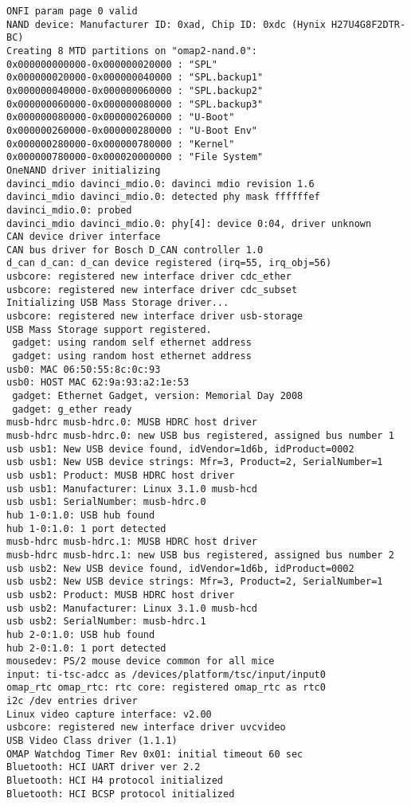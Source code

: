 \documentclass[a4paper,12pt]{report}
\begin{document}
\begin{lstlisting}[caption=Messages de sortie du terminal entre l'allumage de la cible et le prompt de login, label=message_sortie]
ONFI param page 0 valid
NAND device: Manufacturer ID: 0xad, Chip ID: 0xdc (Hynix H27U4G8F2DTR-BC)
Creating 8 MTD partitions on "omap2-nand.0":
0x000000000000-0x000000020000 : "SPL"
0x000000020000-0x000000040000 : "SPL.backup1"
0x000000040000-0x000000060000 : "SPL.backup2"
0x000000060000-0x000000080000 : "SPL.backup3"
0x000000080000-0x000000260000 : "U-Boot"
0x000000260000-0x000000280000 : "U-Boot Env"
0x000000280000-0x000000780000 : "Kernel"
0x000000780000-0x000020000000 : "File System"
OneNAND driver initializing
davinci_mdio davinci_mdio.0: davinci mdio revision 1.6
davinci_mdio davinci_mdio.0: detected phy mask ffffffef
davinci_mdio.0: probed
davinci_mdio davinci_mdio.0: phy[4]: device 0:04, driver unknown
CAN device driver interface
CAN bus driver for Bosch D_CAN controller 1.0
d_can d_can: d_can device registered (irq=55, irq_obj=56)
usbcore: registered new interface driver cdc_ether
usbcore: registered new interface driver cdc_subset
Initializing USB Mass Storage driver...
usbcore: registered new interface driver usb-storage
USB Mass Storage support registered.
 gadget: using random self ethernet address
 gadget: using random host ethernet address
usb0: MAC 06:50:55:8c:0c:93
usb0: HOST MAC 62:9a:93:a2:1e:53
 gadget: Ethernet Gadget, version: Memorial Day 2008
 gadget: g_ether ready
musb-hdrc musb-hdrc.0: MUSB HDRC host driver
musb-hdrc musb-hdrc.0: new USB bus registered, assigned bus number 1
usb usb1: New USB device found, idVendor=1d6b, idProduct=0002
usb usb1: New USB device strings: Mfr=3, Product=2, SerialNumber=1
usb usb1: Product: MUSB HDRC host driver
usb usb1: Manufacturer: Linux 3.1.0 musb-hcd
usb usb1: SerialNumber: musb-hdrc.0
hub 1-0:1.0: USB hub found
hub 1-0:1.0: 1 port detected
musb-hdrc musb-hdrc.1: MUSB HDRC host driver
musb-hdrc musb-hdrc.1: new USB bus registered, assigned bus number 2
usb usb2: New USB device found, idVendor=1d6b, idProduct=0002
usb usb2: New USB device strings: Mfr=3, Product=2, SerialNumber=1
usb usb2: Product: MUSB HDRC host driver
usb usb2: Manufacturer: Linux 3.1.0 musb-hcd
usb usb2: SerialNumber: musb-hdrc.1
hub 2-0:1.0: USB hub found
hub 2-0:1.0: 1 port detected
mousedev: PS/2 mouse device common for all mice
input: ti-tsc-adcc as /devices/platform/tsc/input/input0
omap_rtc omap_rtc: rtc core: registered omap_rtc as rtc0
i2c /dev entries driver
Linux video capture interface: v2.00
usbcore: registered new interface driver uvcvideo
USB Video Class driver (1.1.1)
OMAP Watchdog Timer Rev 0x01: initial timeout 60 sec
Bluetooth: HCI UART driver ver 2.2
Bluetooth: HCI H4 protocol initialized
Bluetooth: HCI BCSP protocol initialized

\end{lstlisting}
\end{document}
